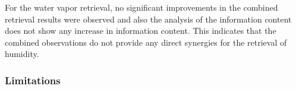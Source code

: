 \documentclass[journal abbreviation, manuscript]{copernicus}
\begin{document}
For the water vapor retrieval, no significant improvements in the combined
retrieval results were observed and also the analysis of the information content
does not show any increase in information content. This indicates that the
combined observations do not provide any direct synergies for the retrieval of
humidity.

%
%
%

\subsubsection{Limitations}
\end{document}
